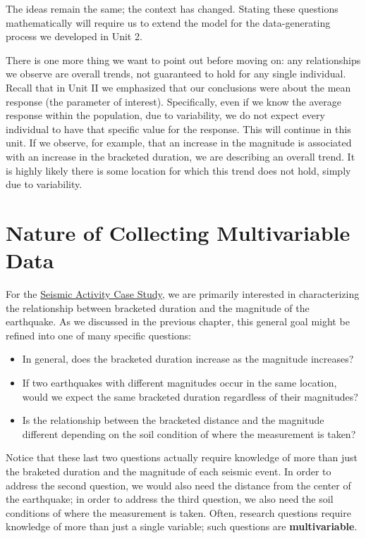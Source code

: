 \documentclass[]{book}
\providecommand{\tightlist}{%
  \setlength{\itemsep}{0pt}\setlength{\parskip}{0pt}}
\theoremstyle{plain}
\theoremstyle{mydefn}
\theoremstyle{myexmpl}
\theoremstyle{remark}
\begin{document}
The ideas remain the same; the context has changed. Stating these
questions mathematically will require us to extend the model for the
data-generating process we developed in Unit 2.

There is one more thing we want to point out before moving on: any
relationships we observe are overall trends, not guaranteed to hold for
any single individual. Recall that in Unit II we emphasized that our
conclusions were about the mean response (the parameter of interest).
Specifically, even if we know the average response within the
population, due to variability, we do not expect every individual to
have that specific value for the response. This will continue in this
unit. If we observe, for example, that an increase in the magnitude is
associated with an increase in the bracketed duration, we are describing
an overall trend. It is highly likely there is some location for which
this trend does not hold, simply due to variability.

\chapter{Nature of Collecting Multivariable Data}\label{Regdata}

For the \protect\hyperlink{CaseGreece}{Seismic Activity Case Study}, we
are primarily interested in characterizing the relationship between
bracketed duration and the magnitude of the earthquake. As we discussed
in the previous chapter, this general goal might be refined into one of
many specific questions:

\begin{itemize}
\tightlist
\item
  In general, does the bracketed duration increase as the magnitude
  increases?
\item
  If two earthquakes with different magnitudes occur in the same
  location, would we expect the same bracketed duration regardless of
  their magnitudes?
\item
  Is the relationship between the bracketed distance and the magnitude
  different depending on the soil condition of where the measurement is
  taken?
\end{itemize}

Notice that these last two questions actually require knowledge of more
than just the braketed duration and the magnitude of each seismic event.
In order to address the second question, we would also need the distance
from the center of the earthquake; in order to address the third
question, we also need the soil conditions of where the measurement is
taken. Often, research questions require knowledge of more than just a
single variable; such questions are \textbf{multivariable}.
\end{document}

